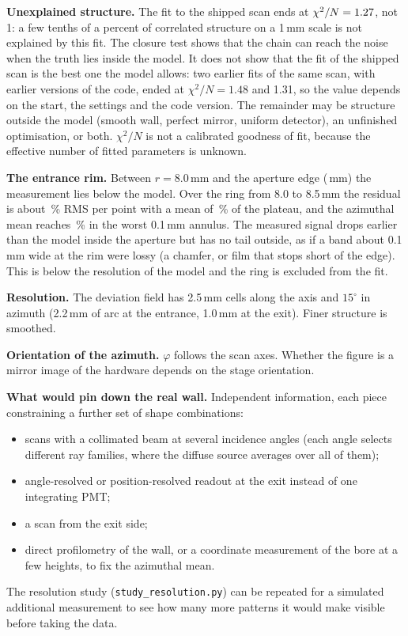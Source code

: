 \documentclass[11pt,a4paper]{article}
\newcommand{\code}[1]{\texttt{#1}}
\begin{document}
\textbf{Unexplained structure.} The fit to the shipped scan ends at $\chi^2/N=1.27$, not 1: a few
tenths of a percent of correlated structure on a 1\,mm scale is not explained by this fit. The
closure test shows that the chain can reach the noise when the truth lies inside the model. It does
not show that the fit of the shipped scan is the best one the model allows: two earlier fits of the
same scan, with earlier versions of the code, ended at $\chi^2/N=1.48$ and 1.31, so the value depends
on the start, the settings and the code version. The
remainder may be structure outside the model (smooth wall, perfect mirror, uniform detector), an
unfinished optimisation, or both. $\chi^2/N$ is not a calibrated goodness of fit, because the
effective number of fitted parameters is unknown.

\textbf{The entrance rim.} Between $r=8.0$\,mm and the aperture edge (\RAp\,mm) the measurement lies
below the model. Over the ring from 8.0 to 8.5\,mm the residual is about \RmsRing\,\% RMS per point
with a mean of \BiasRing\,\% of the plateau, and the azimuthal mean reaches \RingWorst\,\% in the worst
0.1\,mm annulus. The measured signal drops earlier
than the model inside the aperture but has no tail outside, as if a band about 0.1\,mm wide at the rim
were lossy (a chamfer, or film that stops short of the edge). This is below the resolution of the
model and the ring is excluded from the fit.

\textbf{Resolution.} The deviation field has 2.5\,mm cells along the axis and $15^\circ$ in azimuth
(2.2\,mm of arc at the entrance, 1.0\,mm at the exit). Finer structure is smoothed.

\textbf{Orientation of the azimuth.} $\varphi$ follows the scan axes. Whether the figure is a mirror
image of the hardware depends on the stage orientation.

\textbf{What would pin down the real wall.} Independent information, each piece constraining a
further set of shape combinations:
\begin{itemize}
\item scans with a collimated beam at several incidence angles (each angle selects different ray
families, where the diffuse source averages over all of them);
\item angle-resolved or position-resolved readout at the exit instead of one integrating PMT;
\item a scan from the exit side;
\item direct profilometry of the wall, or a coordinate measurement of the bore at a few heights, to
fix the azimuthal mean.
\end{itemize}
The resolution study (\code{study\_resolution.py}) can be repeated for a simulated additional
measurement to see how many more patterns it would make visible before taking the data.
\end{document}
